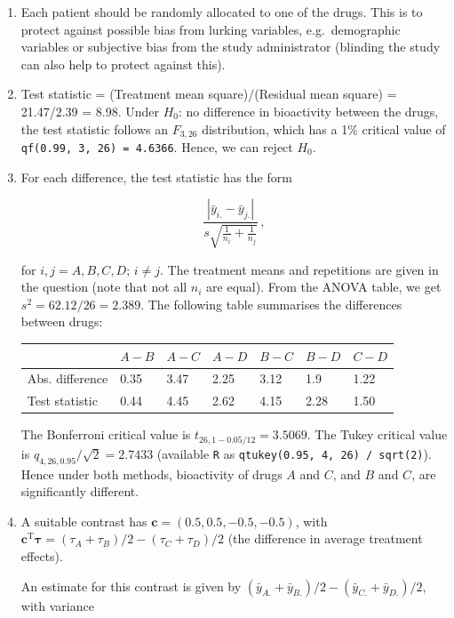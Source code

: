 \documentclass[
]{book}
\theoremstyle{definition}
\theoremstyle{definition}
\theoremstyle{definition}
\theoremstyle{definition}
\theoremstyle{remark}
\begin{document}
\begin{enumerate}
\def\labelenumi{\roman{enumi}.}
\item
  Each patient should be randomly allocated to one of the drugs. This is to protect against possible bias from lurking variables, e.g.~demographic variables or subjective bias from the study administrator (blinding the study can also help to protect against this).
\item
  Test statistic = (Treatment mean square)/(Residual mean square) = 21.47/2.39 = 8.98. Under \(H_0\): no difference in bioactivity between the drugs, the test statistic follows an \(F_{3,26}\) distribution, which has a 1\% critical value of \texttt{qf(0.99,\ 3,\ 26)\ =\ 4.6366}. Hence, we can reject \(H_0\).
\item
  For each difference, the test statistic has the form

  \[
   \frac{|\bar{y}_{i.}-\bar{y}_{j.}|}{s\sqrt{\frac{1}{n_i}+\frac{1}{n_j}}}\,,
   \]

  for \(i, j = A, B, C, D;\, i\ne j\). The treatment means and repetitions are given in the question (note that not all \(n_i\) are equal). From the ANOVA table, we get \(s^2 = 62.12/26 = 2.389\). The following table summarises the differences between drugs:

  \begin{longtable}[]{@{}lllllll@{}}
  \toprule()
  & \(A-B\) & \(A-C\) & \(A-D\) & \(B-C\) & \(B-D\) & \(C-D\) \\
  \midrule()
  \endhead
  Abs. difference & 0.35 & 3.47 & 2.25 & 3.12 & 1.9 & 1.22 \\
  Test statistic & 0.44 & 4.45 & 2.62 & 4.15 & 2.28 & 1.50 \\
  \bottomrule()
  \end{longtable}

  The Bonferroni critical value is \(t_{26, 1-0.05/12} = 3.5069\). The Tukey critical value is \(q_{4,26, 0.95}/\sqrt{2} = 2.7433\) (available \texttt{R} as \texttt{qtukey(0.95,\ 4,\ 26)\ /\ sqrt(2)}). Hence under both methods, bioactivity of drugs \(A\) and \(C\), and \(B\) and \(C\), are significantly different.
\item
  A suitable contrast has \(\boldsymbol{c} = (0.5, 0.5, -0.5, -0.5)\), with \(\boldsymbol{c}^{\mathrm{T}}\boldsymbol{\tau} = (\tau_A + \tau_B) / 2 - (\tau_C + \tau_D) / 2\) (the difference in average treatment effects).

  An estimate for this contrast is given by \((\bar{y}_{A.} + \bar{y}_{B.}) / 2 - (\bar{y}_{C.} + \bar{y}_{D.}) / 2\), with variance


\end{enumerate}
\end{document}
